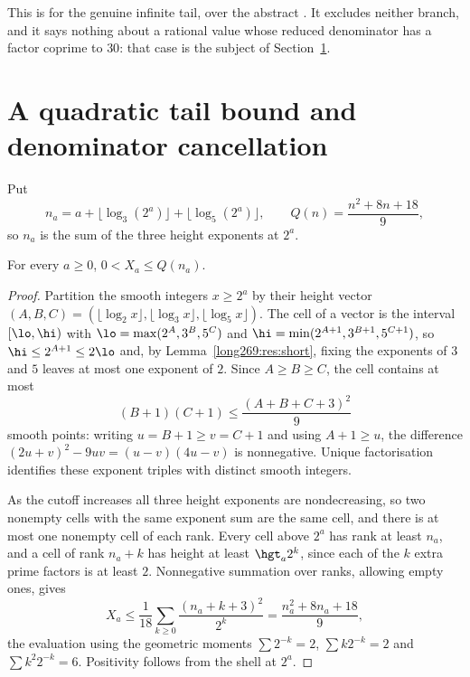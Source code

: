 \noindent This is
for the genuine infinite tail, over the abstract
.  It excludes neither branch, and it says
nothing about a rational value whose reduced denominator has a factor coprime
to $30$: that case is the subject of Section~\ref{long269:sec:actual-orbit}.

\section{A quadratic tail bound and denominator cancellation}
\label{long269:sec:actual-orbit}

Put
\[
 n_a=a+\lfloor\log_3(2^{a})\rfloor+\lfloor\log_5(2^{a})\rfloor,
 \qquad
 Q(n)=\frac{n^{2}+8n+18}{9},
\]
so $n_a$ is the sum of the three height exponents at $2^{a}$.

\begin{theorem}\label{long269:res:actual-tail-bound}
For every $a\ge0$, $0<X_a\le Q(n_a)$.
\end{theorem}

\begin{proof}
Partition the smooth integers $x\ge2^{a}$ by their height vector
$(A,B,C)=(\lfloor\log_2x\rfloor,\lfloor\log_3x\rfloor,\lfloor\log_5x\rfloor)$.
The cell of a vector is the interval $[\lo,\hi)$ with
$\lo=\max(2^{A},3^{B},5^{C})$ and $\hi=\min(2^{A+1},3^{B+1},5^{C+1})$, so
$\hi\le2^{A+1}\le2\lo$ and, by Lemma~\ref{long269:res:short}, fixing the exponents of
$3$ and $5$ leaves at most one exponent of $2$.  Since $A\ge B\ge C$, the cell
contains at most
\[
 (B+1)(C+1)\le\frac{(A+B+C+3)^{2}}{9}
\]
smooth points: writing $u=B+1\ge v=C+1$ and using $A+1\ge u$, the difference
$(2u+v)^{2}-9uv=(u-v)(4u-v)$ is nonnegative.  Unique factorisation identifies
these exponent triples with distinct smooth integers.

As the cutoff increases all three height exponents are nondecreasing, so two
nonempty cells with the same exponent sum are the same cell, and there is at
most one nonempty cell of each rank.  Every cell above $2^{a}$ has rank at
least $n_a$, and a cell of rank $n_a+k$ has height at least $\hgt_a2^{k}$,
since each of the $k$ extra prime factors is at least $2$.  Nonnegative
summation over ranks, allowing empty ones, gives
\[
 X_a\le\frac1{18}\sum_{k\ge0}\frac{(n_a+k+3)^{2}}{2^{k}}
      =\frac{n_a^{2}+8n_a+18}{9},
\]
the evaluation using the geometric moments $\sum2^{-k}=2$, $\sum k2^{-k}=2$
and $\sum k^{2}2^{-k}=6$.  Positivity follows from the shell at $2^{a}$.
\end{proof}

